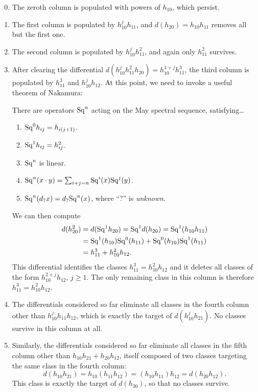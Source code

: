 \begin{enumerate}
    \setcounter{enumi}{-1}
    \item The zeroth column is populated with powers of $h_{10}$, which persist.
    \item The first column is populated by $h_{10}^j h_{11}$, and $d(h_{20}) = h_{10} h_{11}$ removes all but the first one.
    \item The second column is populated by $h_{10}^j h_{11}^2$, and again only $h_{11}^2$ survives.
    \item After clearing the differential $d(h_{10}^j h_{11}^2 h_{20}) = h_{10}^{1+j} h_{11}^3$, the third column is populated by $h_{11}^3$ and $h_{10}^j h_{12}$.
    At this point, we need to invoke a useful theorem of Nakamura:
\begin{theorem}[Nakamura]
There are operators $\mathrm{Sq}^n$ acting on the May spectral sequence, satisfying\ldots
\begin{enumerate}
    \item $\mathrm{Sq}^0 h_{ij} = h_{i(j+1)}$.
    \item $\mathrm{Sq}^1 h_{ij} = h_{ij}^2$.
    \item $\mathrm{Sq}^n$ is linear.
    \item $\mathrm{Sq}^n(x \cdot y) = \sum_{i+j=n} \mathrm{Sq}^i(x) \mathrm{Sq}^j(y)$.
    \item $\mathrm{Sq}^n(d_? x) = d_? \mathrm{Sq}^n(x)$, where ``$?$'' is \emph{unknown}.
\end{enumerate}
\end{theorem}
    We can then compute 
    \begin{align*}
    d(h_{20}^2) & = d(\mathrm{Sq}^1 h_{20}) = \mathrm{Sq}^1 d(h_{20}) = \mathrm{Sq}^1(h_{10} h_{11}) \\
    & = \mathrm{Sq}^1(h_{10}) \mathrm{Sq}^0(h_{11}) + \mathrm{Sq}^0(h_{10}) \mathrm{Sq}^1(h_{11}) \\
    & = h_{11}^3 + h_{10}^2 h_{12}.
    \end{align*}
    This differential identifies the classes $h_{11}^3 = h_{10}^2 h_{12}$ and it deletes all classes of the form $h_{10}^{2+j} h_{12}$, $j \ge 1$.
    The only remaining class in this column is therefore $h_{11}^3 = h_{10}^2 h_{12}$.
    \item The differentials considered so far eliminate all classes in the fourth column other than $h_{10}^j h_{11} h_{12}$, which is exactly the target of $d(h_{10}^j h_{21})$.
    No classes survive in this column at all.
    \item Similarly, the differentials considered so far eliminate all classes in the fifth column other than $h_{10} h_{21} + h_{20} h_{12}$, itself composed of two classes targeting the same class in the fourth column: \[d(h_{10} h_{21}) = h_{10}(h_{11} h_{12}) = (h_{10} h_{11}) h_{12} = d(h_{20} h_{12}).\]
    This class is exactly the target of $d(h_{30})$, so that no classes survive.
\end{enumerate}

